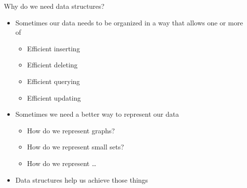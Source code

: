 \documentclass[12pt,t]{beamer}
\newcommand{\bi}{\begin{itemize}}
\newcommand{\ei}{\end{itemize}}
\begin{document}
\begin{frame}{Why do we need data structures?}
    \bi
        \vspace{25pt}

        \item Sometimes our data needs to be organized in a way that allows one or more of
            \bi
                \item Efficient inserting
                \item Efficient deleting
                \item Efficient querying
                \item Efficient updating
            \ei
        \item Sometimes we need a better way to represent our data
            \bi
                \item How do we represent graphs?
                \item How do we represent small sets?
                \item How do we represent \dots
            \ei

        \item Data structures help us achieve those things
    \ei
\end{frame}
\end{document}
